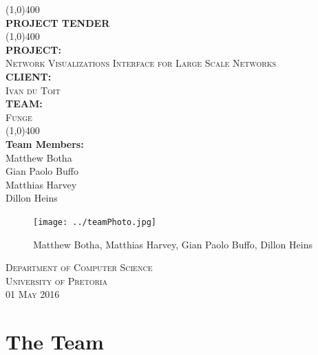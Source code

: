 \documentclass{article}
\begin{document}
\begin{titlepage}
	\begin{center}
		\line(1,0){400}\\
		[6mm]
		\huge{\bfseries PROJECT TENDER}\\
		[2mm]
		\line(1,0){400}\\
		[5mm]
		\large\textbf{PROJECT:}\\\textsc{Network Visualizations Interface for Large Scale Networks}\\
		[3mm]
		\large\textbf{CLIENT:}\\\textsc{Ivan du Toit}\\
		[3mm]
		\large \textbf{TEAM:}\\\textsc{Funge}\\
		\line(1,0){400}\\
		[5mm]
		\large \textbf{Team Members:}\\
		[3mm]
		\large Matthew Botha\\
		\large Gian Paolo Buffo\\
		\large Matthias Harvey\\
        \large Dillon Heins\\[3mm]
		\begin{figure}[H]
			\centering
			\texttt{[image: ../teamPhoto.jpg]}
			\caption{Matthew Botha, Matthias Harvey, Gian Paolo Buffo, Dillon Heins}
		\end{figure}
    \end{center}

	\vspace{7mm}

    \begin{flushright}
        \textsc{\large Department of Computer Science\\
        University of Pretoria\\
        01 May 2016\\}
    \end{flushright}
\end{titlepage}

\section{The Team}
	
\end{document}
